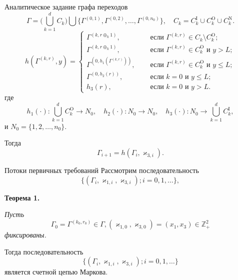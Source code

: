 \documentclass[10pt]{beamer}
\begin{document}
\begin{frame}{Аналитическое задание графа переходов}
  \begin{equation}
  \Gamma = \bigl( \bigcup_{k=1}^d C_k \bigr) \bigcup \{\Gamma^{(0,1)}, \Gamma^{(0,2)}, \ldots, \Gamma^{(0,n_0)}\}, \quad C_k = C_k^{\mathrm{I}} \cup C_k^{\mathrm{O}}  \cup C_k^{\mathrm{N}}.
  \end{equation}
  \begin{equation}
h(\Gamma^{(k,r)},y) = 
\begin{cases}
\Gamma^{(k,r\oplus_k 1)},& \quad \text{ если } \Gamma^{(k,r)}\in C_k\setminus C_k^{\mathrm{O}};\\
\Gamma^{(k,r\oplus_k 1)},& \quad \text{ если } \Gamma^{(k,r)}\in C_k^{\mathrm{O}} \text{ и } y>L;\\
\Gamma^{(0,h_1(\Gamma^{(k,r)}))},& \quad \text{ если } \Gamma^{(k,r)}\in C_k^{\mathrm{O}} \text{ и } y\leqslant L;\\
\Gamma^{(0,h_2(r))},& \quad \text{ если } k=0 \text{ и } y\leqslant L;\\
h_3(r),& \quad \text{ если } k=0 \text{ и } y > L.
\end{cases}
\end{equation}
где 
$$h_1(\cdot)\colon \bigcup_{k=1}^d C_k^{\mathrm{O}}\to N_0, \quad h_2(\cdot)\colon N_0\to N_0, \quad h_3(\cdot)\colon N_0 \to\bigcup_{k=1}^d C_k^{\mathrm{I}},$$ и $N_0=\{1,2, \ldots, n_0\}$.

Тогда 
\begin{equation}
\Gamma_{i+1} = h(\Gamma_i, \varkappa_{3,i}).
\end{equation}
\end{frame}

\begin{frame}{Потоки первичных требований}
Рассмотрим последовательность
\begin{equation}
\label{eq:theMC}
\{(\Gamma_i, \varkappa_{1,i},\varkappa_{3,i}); i =0, 1, \ldots\},
\end{equation}
 
\begin{block}
    {\bf Теорема 1.} {\it 
    Пусть $$\Gamma_0=\Gamma^{(k_0,r_0)} \in \Gamma,  (\varkappa_{1,0}, \varkappa_{3,0})=(x_1,x_3)\in \mathbb{Z}_+^2$$ фиксированы. 
    
    Тогда последовательность $$\{(\Gamma_i, \varkappa_{1,i},\varkappa_{3,i}); i =0, 1, \ldots\}$$ является счетной цепью Маркова.}
\end{block}
\end{frame}
\end{document}
